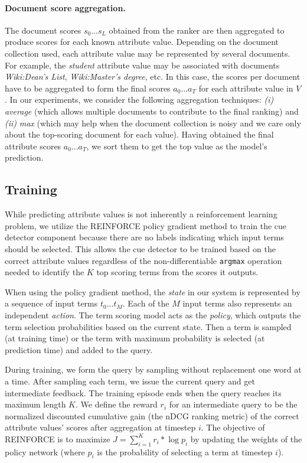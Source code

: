 \paragraph{Document score aggregation.}
The document scores $s_0 ... s_L$ obtained from the ranker are then aggregated to produce scores for each known attribute value. 
Depending on the document collection used, each attribute value may be represented by several documents. For example, the \textit{student} attribute value may be associated with documents \emph{Wiki:Dean's List}, \emph{Wiki:Master's degree}, etc.  In this case, the scores per document have to be aggregated to form the final scores $a_0 ... a_T$ for each attribute value in $V$. In our experiments, we consider the following aggregation techniques: \emph{(i)} \emph{average} (which allows multiple documents to contribute to the final ranking) and \emph{(ii)} \emph{max} (which may help when the document collection is noisy and we care only about the top-scoring document for each value).
Having obtained the final attribute scores $a_0 ... a_T$, we sort them to get the top 
value as the model's prediction.


\subsection{Training}
While predicting attribute values is not inherently a reinforcement learning problem, we utilize the REINFORCE policy gradient method to train the cue detector component because there are no labels indicating which input terms should be selected. 
This allows the cue detector to be trained based on the correct attribute values regardless of the non-differentiable \texttt{argmax} operation needed to identify the $K$ top scoring terms from the scores it outputs.

When using the policy gradient method, the \textit{state} in our system is represented by a sequence of input terms $t_0 ... t_M$. Each of the $M$ input terms also represents an independent \textit{action}. The term scoring model acts as the \textit{policy}, which outputs the term selection probabilities based on the current state. Then a term is sampled (at training time) or the term with maximum probability is selected (at prediction time) and added to the query. 

During training, we form the query by sampling without replacement one word at a time.
After sampling each term, we issue the current query and get intermediate feedback.
The training episode ends when the query reaches its maximum length $K$.
We define the reward $r_i$ for an intermediate query 
to be the normalized discounted cumulative gain (the nDCG ranking metric) of the correct attribute values' scores after aggregation at timestep $i$.
The objective of REINFORCE is to maximize $J = \sum^K_{i=1} r_i * \log p_i$ by updating the weights of the policy network (where $p_i$ is the probability of selecting a term at timestep $i$).